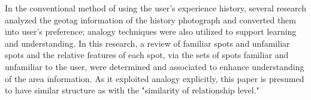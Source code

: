 \documentclass[journal]{IAENGtran}
\begin{document}
In the conventional method of using the user's experience history, several research analyzed the geotag information of the history photograph and converted them into user's preference; analogy techniques were also utilized to support learning and understanding.
In this research, a review of familiar spots and unfamiliar spots and the relative features of each spot, via the sets of spots familiar and unfamiliar to the user, were determined and associated to enhance understanding of the area information.
As it exploited analogy explicitly, this paper is presumed to have similar structure as with the "similarity of relationship level."


\end{document}
